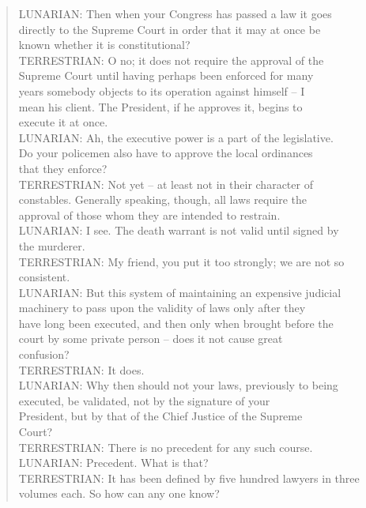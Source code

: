 \documentclass[11pt]{article}
\begin{document}
\begin{quote}   LUNARIAN:  Then when your Congress has passed a law it goes \\
      directly to the Supreme Court in order that it may at once be \\
      known whether it is constitutional? \\
  TERRESTRIAN:  O no; it does not require the approval of the \\
      Supreme Court until having perhaps been enforced for many \\
      years somebody objects to its operation against himself -- I \\
      mean his client.  The President, if he approves it, begins to \\
      execute it at once. \\
  LUNARIAN:  Ah, the executive power is a part of the legislative. \\
      Do your policemen also have to approve the local ordinances \\
      that they enforce? \\
  TERRESTRIAN:  Not yet -- at least not in their character of \\
      constables.  Generally speaking, though, all laws require the \\
      approval of those whom they are intended to restrain. \\
  LUNARIAN:  I see.  The death warrant is not valid until signed by \\
      the murderer. \\
  TERRESTRIAN:  My friend, you put it too strongly; we are not so \\
      consistent. \\
  LUNARIAN:  But this system of maintaining an expensive judicial \\
      machinery to pass upon the validity of laws only after they \\
      have long been executed, and then only when brought before the \\
      court by some private person -- does it not cause great \\
      confusion? \\
  TERRESTRIAN:  It does. \\
  LUNARIAN:  Why then should not your laws, previously to being \\
      executed, be validated, not by the signature of your \\
      President, but by that of the Chief Justice of the Supreme \\
      Court? \\
  TERRESTRIAN:  There is no precedent for any such course. \\
  LUNARIAN:  Precedent.  What is that? \\
  TERRESTRIAN:  It has been defined by five hundred lawyers in three \\
      volumes each.  So how can any one know?  \end{quote}
\end{document}
